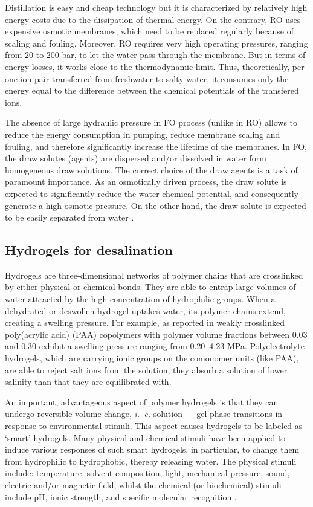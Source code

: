 \documentclass[journal,article,submit,pdftex,moreauthors]{Definitions/mdpi}
\newcommand{\ie}{\textit{i.~e.} }
\begin{document}
Distillation is easy and cheap technology but it is characterized by relatively high energy costs due to the dissipation of thermal energy. 
On the contrary, RO uses expensive osmotic membranes, which need to be replaced regularly because of scaling and fouling. 
Moreover, RO requires very high operating pressures, ranging from 20 to 200 bar, to let the water pass through the membrane. 
But in terms of energy losses, it works close to the thermodynamic limit.
Thus, theoretically, per one ion pair transferred from freshwater to salty water, it consumes only the energy equal to the difference between the chemical potentials of the transfered ions.

The absence of large hydraulic pressure in FO process (unlike in RO) allows to reduce the energy consumption in pumping, reduce membrane scaling and fouling, and therefore significantly increase the lifetime of the membranes. 
In FO, the draw solutes (agents) are dispersed and/or dissolved in water form homogeneous draw solutions. 
The correct choice of the draw agents is a task of paramount importance. 
As an osmotically driven process, the draw solute is expected to significantly reduce the water chemical potential, and consequently generate a high osmotic pressure. 
On the other hand, the draw solute is expected to be easily separated from water \cite{Cai2016}.

\subsection{Hydrogels for desalination}
Hydrogels are three-dimensional networks of polymer chains that are crosslinked by either physical or chemical bonds. 
They are able to entrap large volumes of water attracted by the high concentration of hydrophilic groups. 
When a dehydrated or deswollen hydrogel uptakes water, its polymer chains extend, creating a swelling pressure. 
For example, as reported in \cite{Wack_2009} weakly crosslinked poly(acrylic acid) (PAA) copolymers with polymer volume fractions between 0.03 and 0.30 exhibit a swelling pressure ranging from 0.20--4.23 MPa.
Polyelectrolyte hydrogels, which are carrying ionic groups on the comonomer units (like PAA), are able to reject salt ions from the solution, they absorb a solution of lower salinity than that they are equilibrated with. 

An important, advantageous aspect of polymer hydrogels is that they can undergo reversible volume change, \ie solution --- gel phase transitions in response to environmental stimuli. 
This aspect causes hydrogels to be labeled as ‘smart’ hydrogels. 
Many physical and chemical stimuli have been applied to induce various responses of such smart hydrogels, in particular, to change them from hydrophilic to hydrophobic, thereby releasing water. 
The physical stimuli include: temperature, solvent composition, light, mechanical pressure, sound, electric and/or magnetic field, whilst the chemical (or biochemical) stimuli include pH, ionic strength, and specific molecular recognition \cite{Tanaka_1982,Serizawa_2001,Lietor_Santos_2009,Qiu_2001}.
\end{document}
